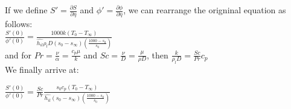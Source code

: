 	\noindent If we define $S' = \frac{\partial S}{\partial \eta} $ and $ \phi ' = \frac{\partial \phi}{\partial \eta}$, we can rearrange the origninal equation as follows:\\

	$\frac{S'(0)}{\phi'(0)} = \frac{1000 k (T_0 - T_\infty)}{\hat{h_{il}} \rho_l D (s_0 - s_\infty)\left(\frac{1000 - s_0}{s_0}\right)}$\\

	\noindent and for $Pr = \frac{\nu}{\alpha} = \frac{c_p \mu}{k}$ and $Sc = \frac{\nu}{D}=\frac{\mu}{\rho D}$, then $\frac{k}{\rho_l D} = \frac{Sc}{Pr}c_p$\\

	We finally arrive at:\\
	\begin{center}
		$\frac{S'(0)}{\phi'(0)} = \frac{Sc}{Pr}\frac{s_0 c_p (T_0 - T_\infty)}{\hat{h_{il}} (s_0 - s_\infty) \left(\frac{1000 - s_0}{s_0} \right) }$
	\end{center}

 

	
	
% 
